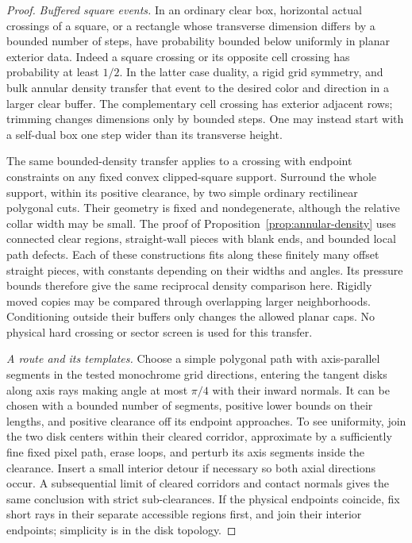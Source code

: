 \begin{proof}
\emph{Buffered square events.}
In an ordinary clear box, horizontal actual crossings of a square,
or a rectangle whose transverse dimension differs by a bounded
number of steps, have probability bounded below uniformly in
planar exterior data.  Indeed a square crossing or its opposite
cell crossing has probability at least \(1/2\).  In the latter
case duality, a rigid grid symmetry, and bulk annular density
transfer that event to the desired color and direction in a
larger clear buffer.  The complementary cell crossing has
exterior adjacent rows; trimming changes dimensions only by
bounded steps.  One may instead start with a self-dual box
one step wider than its transverse height.

The same bounded-density transfer applies to a crossing with
endpoint constraints on any fixed convex clipped-square support.
Surround the whole support, within its positive clearance, by
two simple ordinary rectilinear polygonal cuts.  Their geometry
is fixed and nondegenerate, although the relative collar width
may be small.  The proof of
Proposition~\ref{prop:annular-density} uses connected clear
regions, straight-wall pieces with blank ends, and bounded
local path defects.  Each of these constructions fits along
these finitely many offset straight pieces, with constants
depending on their widths and angles.  Its pressure bounds
therefore give the same reciprocal density comparison here.
Rigidly moved copies may be compared through overlapping
larger neighborhoods.  Conditioning outside their buffers
only changes the allowed planar caps.  No physical hard
crossing or sector screen is used for this transfer.

\emph{A route and its templates.}
Choose a simple polygonal path with axis-parallel segments in
the tested monochrome grid directions, entering the tangent
disks along axis rays making angle at most \(\pi/4\) with their
inward normals.  It can be chosen with a bounded number of
segments, positive lower bounds on their lengths, and positive
clearance off its endpoint approaches.  To see uniformity,
join the two disk centers within their cleared corridor,
approximate by a sufficiently fine fixed pixel path, erase
loops, and perturb its axis segments inside the clearance.
Insert a small interior detour if necessary so both axial
directions occur.  A subsequential limit of cleared corridors
and contact normals gives the same conclusion with strict
sub-clearances.  If the physical endpoints coincide, fix
short rays in their separate accessible regions first, and
join their interior endpoints; simplicity is in the disk
topology.


\end{proof}
